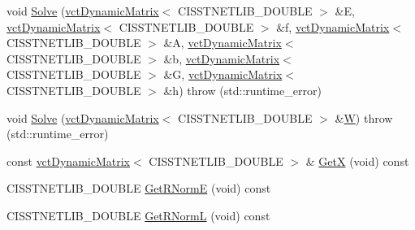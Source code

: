 \begin{DoxyCompactItemize}
\item 
void \hyperlink{classnmr_l_s_e_i_solver_a8e79cde23418891a18508fc3e9db876f}{Solve} (\hyperlink{classvct_dynamic_matrix}{vct\+Dynamic\+Matrix}$<$ C\+I\+S\+S\+T\+N\+E\+T\+L\+I\+B\+\_\+\+D\+O\+U\+B\+L\+E $>$ \&E, \hyperlink{classvct_dynamic_matrix}{vct\+Dynamic\+Matrix}$<$ C\+I\+S\+S\+T\+N\+E\+T\+L\+I\+B\+\_\+\+D\+O\+U\+B\+L\+E $>$ \&f, \hyperlink{classvct_dynamic_matrix}{vct\+Dynamic\+Matrix}$<$ C\+I\+S\+S\+T\+N\+E\+T\+L\+I\+B\+\_\+\+D\+O\+U\+B\+L\+E $>$ \&A, \hyperlink{classvct_dynamic_matrix}{vct\+Dynamic\+Matrix}$<$ C\+I\+S\+S\+T\+N\+E\+T\+L\+I\+B\+\_\+\+D\+O\+U\+B\+L\+E $>$ \&b, \hyperlink{classvct_dynamic_matrix}{vct\+Dynamic\+Matrix}$<$ C\+I\+S\+S\+T\+N\+E\+T\+L\+I\+B\+\_\+\+D\+O\+U\+B\+L\+E $>$ \&G, \hyperlink{classvct_dynamic_matrix}{vct\+Dynamic\+Matrix}$<$ C\+I\+S\+S\+T\+N\+E\+T\+L\+I\+B\+\_\+\+D\+O\+U\+B\+L\+E $>$ \&h)  throw (std\+::runtime\+\_\+error)
\item 
void \hyperlink{classnmr_l_s_e_i_solver_afaef5a6ce13d66c3744d344c9c0702db}{Solve} (\hyperlink{classvct_dynamic_matrix}{vct\+Dynamic\+Matrix}$<$ C\+I\+S\+S\+T\+N\+E\+T\+L\+I\+B\+\_\+\+D\+O\+U\+B\+L\+E $>$ \&\hyperlink{classnmr_l_s_e_i_solver_ab4e958a8679e59284ab62db215533c67}{W})  throw (std\+::runtime\+\_\+error)
\item 
const \hyperlink{classvct_dynamic_matrix}{vct\+Dynamic\+Matrix}$<$ C\+I\+S\+S\+T\+N\+E\+T\+L\+I\+B\+\_\+\+D\+O\+U\+B\+L\+E $>$ \& \hyperlink{classnmr_l_s_e_i_solver_a28143d347b93ead0708dcb7a1badda88}{Get\+X} (void) const 
\item 
C\+I\+S\+S\+T\+N\+E\+T\+L\+I\+B\+\_\+\+D\+O\+U\+B\+L\+E \hyperlink{classnmr_l_s_e_i_solver_af8d87848c598a766ca61cb0017621a5f}{Get\+R\+Norm\+E} (void) const 
\item 
C\+I\+S\+S\+T\+N\+E\+T\+L\+I\+B\+\_\+\+D\+O\+U\+B\+L\+E \hyperlink{classnmr_l_s_e_i_solver_a1622b27f3022ad3b2a1724140d0272af}{Get\+R\+Norm\+L} (void) const 
\end{DoxyCompactItemize}
